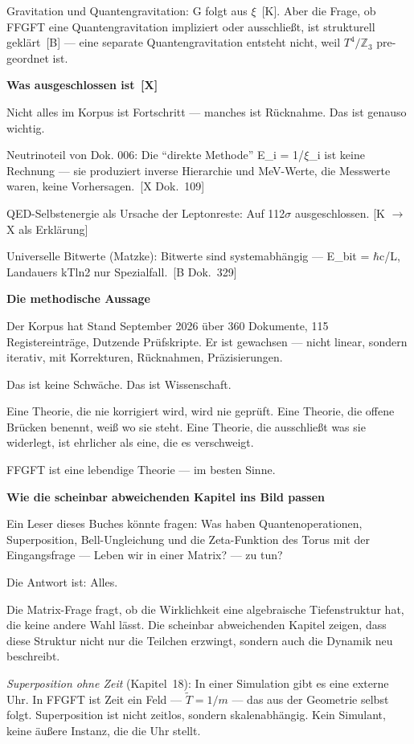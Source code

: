 \documentclass[11pt,oneside]{book}
\newcommand{\status}[1]{\penalty10000\,{\scriptsize\textcolor{gray!60}{[#1]}}}
\begin{document}
Gravitation und Quantengravitation: G folgt aus $\xi$ \status{K}. Aber die Frage,
ob FFGFT eine Quantengravitation impliziert oder ausschließt, ist
strukturell geklärt \status{B} — eine separate Quantengravitation entsteht
nicht, weil $T^4/\mathbb{Z}_3$ pre-geordnet ist.


\textbf{Was ausgeschlossen ist \status{X}}


Nicht alles im Korpus ist Fortschritt — manches ist Rücknahme. Das ist
genauso wichtig.


Neutrinoteil von Dok. 006: Die \enquote{direkte Methode} E\_i = 1/$\xi$\_i ist keine
Rechnung — sie produziert inverse Hierarchie und MeV-Werte, die
Messwerte waren, keine Vorhersagen. \status{X Dok.~109}


QED-Selbstenergie als Ursache der Leptonreste: Auf 112$\sigma$ ausgeschlossen.
[K $\to$ X als Erklärung]


Universelle Bitwerte (Matzke): Bitwerte sind systemabhängig — E\_bit = $\hbar$c/L,
Landauers kTln2 nur Spezialfall. \status{B Dok.~329}


\textbf{Die methodische Aussage}


Der Korpus hat Stand September 2026 über 360 Dokumente, 115 Registereinträge,
Dutzende Prüfskripte. Er ist gewachsen — nicht linear, sondern iterativ,
mit Korrekturen, Rücknahmen, Präzisierungen.


Das ist keine Schwäche. Das ist Wissenschaft.


Eine Theorie, die nie korrigiert wird, wird nie geprüft. Eine Theorie,
die offene Brücken benennt, weiß wo sie steht. Eine Theorie, die
ausschließt was sie widerlegt, ist ehrlicher als eine, die es verschweigt.


FFGFT ist eine lebendige Theorie — im besten Sinne.


\textbf{Wie die scheinbar abweichenden Kapitel ins Bild passen}


Ein Leser dieses Buches könnte fragen: Was haben Quantenoperationen,
Superposition, Bell-Ungleichung und die Zeta-Funktion des Torus mit der
Eingangsfrage — Leben wir in einer Matrix? — zu tun?

Die Antwort ist: Alles.

Die Matrix-Frage fragt, ob die Wirklichkeit eine algebraische Tiefenstruktur
hat, die keine andere Wahl lässt. Die scheinbar abweichenden Kapitel zeigen,
dass diese Struktur nicht nur die Teilchen erzwingt, sondern auch die
Dynamik neu beschreibt.

\textit{Superposition ohne Zeit} (Kapitel~18): In einer Simulation gibt
es eine externe Uhr. In FFGFT ist Zeit ein Feld — $\tilde{T} = 1/m$ —
das aus der Geometrie selbst folgt. Superposition ist nicht zeitlos,
sondern skalenabhängig. Kein Simulant, keine äußere Instanz, die die
Uhr stellt.
\end{document}
